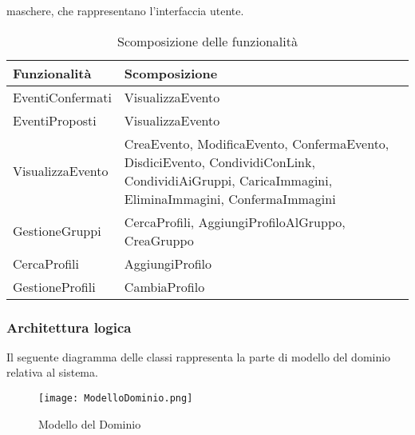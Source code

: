 maschere, che rappresentano l'interfaccia utente.
\clearpage


\begin{table}[htbp]
    \centering
    \begin{tabular} {|P{7.3cm}|P{8cm}|}
        \hline
        \textbf{Funzionalità} & \textbf{Scomposizione}                                                                                                                            \\
        \hline
        EventiConfermati      & VisualizzaEvento                                                                                                                                  \\
        \hline
        EventiProposti        & VisualizzaEvento                                                                                                                                  \\
        \hline
        VisualizzaEvento      & CreaEvento, ModificaEvento, ConfermaEvento, DisdiciEvento, CondividiConLink, CondividiAiGruppi, CaricaImmagini, EliminaImmagini, ConfermaImmagini \\
        \hline
        GestioneGruppi        & CercaProfili, AggiungiProfiloAlGruppo, CreaGruppo                                                                                                 \\
        \hline
        CercaProfili          & AggiungiProfilo                                                                                                                                   \\
        \hline
        GestioneProfili       & CambiaProfilo                                                                                                                                     \\
        \hline
    \end{tabular}
    \caption{Scomposizione delle funzionalità}

\end{table}

\subsubsection{Architettura logica}

Il seguente diagramma delle classi rappresenta la parte di modello del dominio relativa al sistema. \\

\begin{figure}[h!]
    \begin{center}
        \texttt{[image: ModelloDominio.png]}
        \caption{Modello del Dominio}
    \end{center}
\end{figure}

